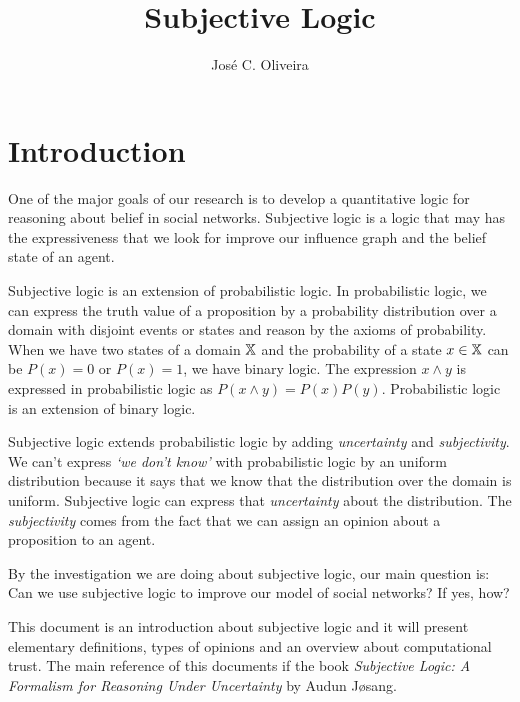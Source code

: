 \documentclass[a4paper,12pt]{article}
\title{Subjective Logic}
\author{José C. Oliveira}
\theoremstyle{definition}
\numberwithin{equation}{section}
\newcommand{\qm}[1]{`#1'}
\begin{document}
\maketitle

\section{Introduction}

One of the major goals of our research is to develop a quantitative logic for reasoning about belief in social networks. Subjective logic is a logic that may has the expressiveness that we look for improve our influence graph and the belief state of an agent.

Subjective logic is an extension of probabilistic logic. In probabilistic logic, we can express the truth value of a proposition by a probability distribution over a domain with disjoint events or states and reason by the axioms of probability. When we have two states of a domain $\mathbb{X}$ and the probability of a state $x \in \mathbb{X}$ can be $P(x) = 0$ or $P(x) = 1$, we have binary logic. The expression $x \land y$ is expressed in probabilistic logic as $P(x \land y) = P(x)P(y)$. Probabilistic logic is an extension of binary logic.

Subjective logic extends probabilistic logic by adding \emph{uncertainty} and \emph{subjectivity}. We can't express \emph{\qm{we don't know}} with probabilistic logic by an uniform distribution because it says that we know that the distribution over the domain is uniform. Subjective logic can express that \emph{uncertainty} about the distribution. The \emph{subjectivity} comes from the fact that we can assign an opinion about a proposition to an agent.

By the investigation we are doing about subjective logic, our main question is: Can we use subjective logic to improve our model of social networks? If yes, how?

This document is an introduction about subjective logic and it will present elementary definitions, types of opinions and an overview about computational trust. The main reference of this documents if the book \emph{Subjective Logic: A Formalism for Reasoning Under Uncertainty} by Audun Jøsang.


%	
%	
%	
\end{document}
